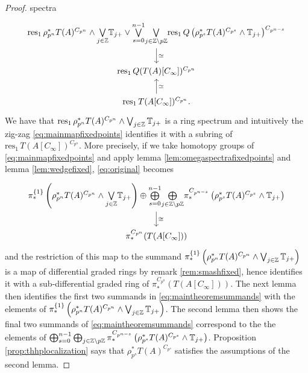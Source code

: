 \begin{proof}
spectra
\begin{equation}\label{eq:mainmapfixedpoints}
\begin{tikzcd}
\mathrm{res_1}\, \rho_{p^{n}}^\ast T(A)  ^{ C_{ p^{ n  } } }
\wedge 
\underset{j \in \ZZ}{\bigvee}\TT_{j+}
\vee
\overset{n-1}{\underset{s=0}{\bigvee}} \underset{j\in \ZZ\setminus p\ZZ}{\bigvee}\mathrm{res_1} \,  Q \left( \rho_{ p^s }^\ast  
  T(A) ^{ C_{ p^s } } \wedge 
 \TT_{j+}\right) ^{ C_{ p^{ n - s} } }
 \arrow{d}{\simeq}\\
\mathrm{res}_1\, Q(T(A)[C_\infty])^{C_{p^n}}\\
\mathrm{res}_1\,T(A[C_\infty])^{C_{p^n}}.
\arrow{u}[swap]{\simeq}
 \end{tikzcd}
\end{equation}
We have that $\mathrm{res_1}\, \rho_{p^{n}}^\ast T(A)  ^{ C_{ p^{ n  } } }
\wedge 
\bigvee_{j \in \mathbb{Z}}\mathbb{T}_{j+}$ is a ring spectrum and intuitively the zig-zag
\eqref{eq:mainmapfixedpoints} identifies it with a subring of $\mathrm{res}_1\,T(A[C_\infty])^{C_{p^n}}$.
More precisely, if we take homotopy groups of \eqref{eq:mainmapfixedpoints} and apply lemma 
\ref{lem:omegaspectrafixedpoints} and lemma \ref{lem:wedgefixed},
\eqref{eq:original} becomes
\[
\begin{tikzcd}
 \pi_\ast^{\{1\}}\left(
\rho_{p^{n}}^\ast T(A)  ^{ C_{ p^{ n  } } }
\wedge 
\underset{j \in \ZZ}{\bigvee}\TT_{j+}\right)
\oplus \overset{ n - 1 }{\underset{ s = 0}{\bigoplus}}
\underset{ j\in \ZZ\setminus p\ZZ }{\bigoplus}
\pi_\ast^{C_{p^{n-s}}}  \left(
 \rho^\ast_{ p^s } 
T(A) ^{ C_{ p^s } }\wedge 
\TT_{j+}  \right)
\arrow{d}{\cong}\\ 
\pi_\ast^{C_{p^{n}}} ( T (A[ C_\infty] ) )
\end{tikzcd}
\]
and the restriction of this map to the summand $ \pi_\ast^{\{1\}}\left(
\rho_{p^{n}}^\ast T(A)  ^{ C_{ p^{ n  } } }
\wedge 
\bigvee_{j \in \mathbb{Z}}\mathbb{T}_{j+}\right)$ is a map of differential graded rings
by remark \ref{rem:smashfixed}, 
hence identifies it with a sub-differential graded ring of
$\pi_\ast^{C_{p^{n}}} ( T (A[ C_\infty] ) )$.
The next lemma then identifies
the first two summands in \eqref{eq:maintheoremsummands} with the 
elements of $ \pi_\ast^{\{1\}}\left(
\rho_{p^{n}}^\ast T(A)  ^{ C_{ p^{ n  } } }
\wedge 
\bigvee_{j \in \mathbb{Z}}\mathbb{T}_{j+}\right)$. The second lemma then
shows the final two
summands of \eqref{eq:maintheoremsummands}
correspond to the 
the elements of $ \bigoplus_{ s = 0}^{ n - 1 }
\bigoplus_{ j\in \mathbb{Z}\setminus p\mathbb{Z} }
\pi_\ast^{C_{p^{n-s}}}  \left(
 \rho^\ast_{ p^s } 
T(A) ^{ C_{ p^s } }\wedge 
\mathbb{T}_{j+}  \right)$.
Proposition \ref{prop:thhplocalization} says that $ \rho^\ast_{ p^s } 
T(A) ^{ C_{ p^s } }$ satisfies the assumptions of the second lemma.
\end{proof}
